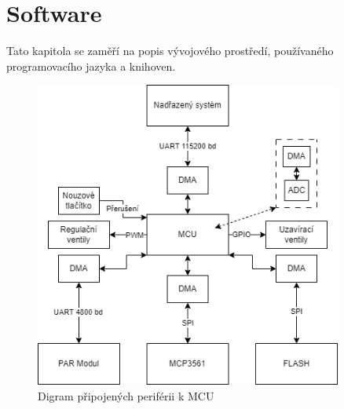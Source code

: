 \chapter{Software}
Tato kapitola se zaměří na popis vývojového prostředí, používaného programovacího jazyka a knihoven.
\begin{figure}[H]
    \label{fig:sw_diagram}
    \caption{Digram připojených periférii k MCU}
    \includegraphics[width=0.9\textwidth]{pictures/sw_diagram.png}
\end{figure}
